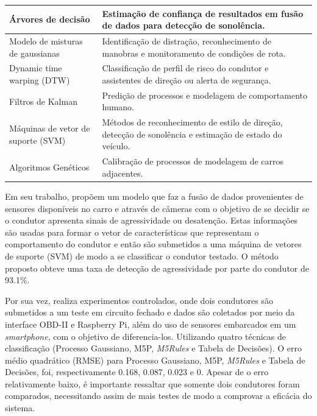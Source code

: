 \begin{table}[!htb]
\begin{tabular}{p{55mm}|p{95mm}}
		Árvores de decisão                     & Estimação de confiança de resultados em fusão de dados para detecção de sonolência.                                                 \\ \hline
		Modelo de misturas de gaussianas       & Identificação de distração, reconhecimento de manobras e monitoramento de condições de rota.                                       \\ \hline
		Dynamic time warping (DTW)             & Classificação de perfil de risco do condutor e assistentes de direção ou alerta de segurança.                                       \\ \hline
		Filtros de Kalman                      & Predição de processos e modelagem de comportamento humano.                                                                          \\ \hline
		Máquinas de vetor de suporte (SVM)     & Métodos de reconhecimento de estilo de direção, detecção de sonolência e estimação de estado do veículo.                            \\ \hline
		Algoritmos Genéticos                   & Calibração de processos de modelagem de carros adjacentes.                                                                          \\ \hline
	\end{tabular}
\end{table}

Em seu trabalho,  propõem um modelo que faz a fusão de dados provenientes de sensores disponíveis no carro e através de câmeras com o objetivo de se decidir se o condutor apresenta sinais de agressividade ou desatenção. Estas informações são usadas para formar o vetor de características que representam o comportamento do condutor e então são submetidos a uma máquina de vetores de suporte (SVM) de modo a se classificar o condutor testado. O método proposto obteve uma taxa de detecção de agressividade por parte do condutor de 93.1\%.

Por sua vez,  realiza experimentos controlados, onde dois condutores são submetidos a um teste em circuito fechado e dados são coletados por meio da interface OBD-II e Raspberry Pi, além do uso de sensores embarcados em um \textit{smartphone}, com o objetivo de diferencia-los. Utilizando quatro técnicas de classificação (Processo Gaussiano, M5P, \textit{M5Rules} e Tabela de Decisões). O erro médio quadrático (RMSE) para Processo Gaussiano, M5P, \textit{M5Rules} e Tabela de Decisões, foi, respectivamente 0.168, 0.087, 0.023 e 0. Apesar de o erro relativamente baixo, é importante ressaltar que somente dois condutores foram comparados, necessitando assim de mais testes de modo a comprovar a eficácia do sistema.

